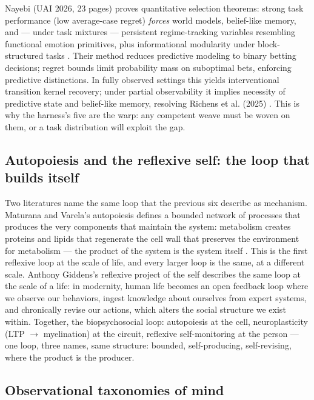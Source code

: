 \documentclass[11pt]{article}
\begin{document}
Nayebi (UAI 2026, 23 pages) proves quantitative selection theorems: strong task performance (low average-case regret) \emph{forces} world models, belief-like memory, and --- under task mixtures --- persistent regime-tracking variables resembling functional emotion primitives, plus informational modularity under block-structured tasks \citep{nayebi2026}. Their method reduces predictive modeling to binary betting decisions; regret bounds limit probability mass on suboptimal bets, enforcing predictive distinctions. In fully observed settings this yields interventional transition kernel recovery; under partial observability it implies necessity of predictive state and belief-like memory, resolving Richens et al. (2025) \citep{nayebi2026}. This is why the harness's five are the warp: any competent weave must be woven on them, or a task distribution will exploit the gap.

\subsection{Autopoiesis and the reflexive self: the loop that builds itself}

Two literatures name the same loop that the previous six describe as mechanism. Maturana and Varela's autopoiesis defines a bounded network of processes that produces the very components that maintain the system: metabolism creates proteins and lipids that regenerate the cell wall that preserves the environment for metabolism --- the product of the system is the system itself \citep{maturana1980}. This is the first reflexive loop at the scale of life, and every larger loop is the same, at a different scale. Anthony Giddens's reflexive project of the self \citep{giddens1991} describes the same loop at the scale of a life: in modernity, human life becomes an open feedback loop where we observe our behaviors, ingest knowledge about ourselves from expert systems, and chronically revise our actions, which alters the social structure we exist within. Together, the biopsychosocial loop: autopoiesis at the cell, neuroplasticity (LTP $\to$\allowbreak{} myelination) at the circuit, reflexive self-monitoring at the person --- one loop, three names, same structure: bounded, self-producing, self-revising, where the product is the producer.

\subsection{Observational taxonomies of mind}
\end{document}
